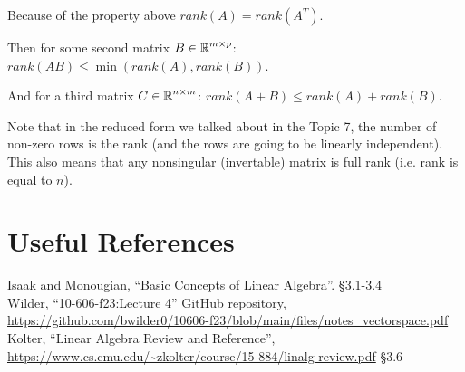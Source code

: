 Because of the property above $rank(A) = rank(A^T)$. 

Then for some second matrix $B\in\operatorname{\mathbb{R}}^{m\times p}$: $rank(AB) \le \min(rank(A),rank(B))$. 

And for a third matrix $C\in\operatorname{\mathbb{R}}^{n\times m}$: $rank(A + B) \le rank(A) + rank(B).$

Note that in the reduced form we talked about in the Topic 7, the number of non-zero rows is the rank (and the rows are going to be linearly independent). 
This also means that any nonsingular (invertable) matrix is full rank (i.e. rank is equal to $n$). 

\section*{Useful References}
Isaak and Monougian, ``Basic Concepts of Linear Algebra''. \S 3.1-3.4\\
Wilder, ``10-606-f23:Lecture 4'' GitHub repository, \url{https://github.com/bwilder0/10606-f23/blob/main/files/notes_vectorspace.pdf}\\
Kolter, ``Linear Algebra Review and Reference'', \url{https://www.cs.cmu.edu/~zkolter/course/15-884/linalg-review.pdf} \S3.6


